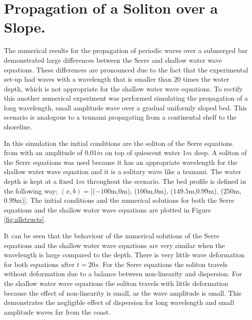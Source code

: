 \documentclass[a4paper,fleqn]{article} %
\begin{document}
\section{Propagation of a Soliton over a Slope.}
\label{Soliton up a Slope}
The numerical results for the propagation of periodic waves over a submerged bar demonstrated large differences between the Serre and shallow water wave equations. These differences are pronounced due to the fact that the experimental set-up had waves with a wavelength that is smaller than $20$ times the water depth, which is not appropriate for the shallow water wave equations. To rectify this another numerical experiment was performed simulating the propagation of a long wavelength, small amplitude wave over a gradual uniformly sloped bed. This scenario is analogous to a tsunami propagating from a continental shelf to the shoreline.

In this simulation the initial conditions are the soliton of the Serre equations from \cite{El-etal-2006} with an amplitude of $0.01m$ on top of quiescent water $1m$ deep. A soliton of the Serre equations was used because it has an appropriate wavelength for the shallow water wave equation and it is a solitary wave like a tsunami. The water depth is kept at a fixed $1m$ throughout the scenario. The bed profile is defined in the following way; $(x,b) = [$($-100$m,$0$m), ($100$m,$0$m), ($149.5$m,$0.99$m), ($250$m,$0.99$m)$]$. The initial conditions and the numerical solutions for both the Serre equations and the shallow water wave equations are plotted in Figure \ref{fig:allstructs}.

It can be seen that the behaviour of the numerical solutions of the Serre equations and the shallow water wave equations are very similar when the wavelength is large compared to the depth. There is very little wave deformation for both equations after $t=20s$. For the Serre equations the soliton travels without deformation due to a balance between non-linearity and dispersion. For the shallow water wave equations the soliton travels with little deformation because the effect of non-linearity is small, as the wave amplitude is small. This demonstrates the negligible effect of dispersion for long wavelength and small amplitude waves far from the coast. 
\end{document}
